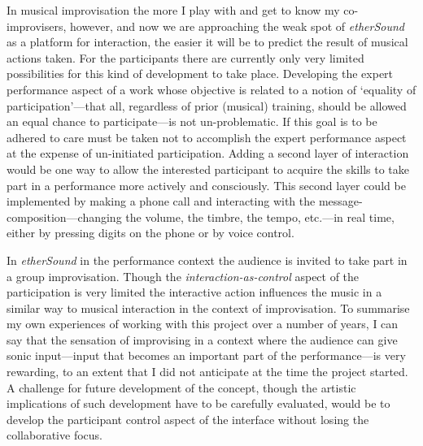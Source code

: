 In musical improvisation the more I play with and get to know my co-improvisers, however, and now we are approaching the weak spot of \emph{etherSound} as a platform for interaction, the easier it will be to predict the result of musical actions taken. For the participants there are currently only very limited possibilities for this kind of development to take place. Developing the expert performance aspect of a work whose objective is related to a notion of `equality of participation'---that all, regardless of prior (musical) training, should be allowed an equal chance to participate---is not un-problematic. If this goal is to be adhered to care must be taken not to accomplish the expert performance aspect at the expense of un-initiated participation. Adding a second layer of interaction would be one way to allow the interested participant to acquire the skills to take part in a performance more actively and consciously. This second layer could be implemented by making a phone call and interacting with the message-composition---changing the volume, the timbre, the tempo, etc.---in real time, either by pressing digits on the phone or by voice control. 

In \emph{etherSound} in the performance context the audience is invited to take part in a group improvisation. Though the \emph{interaction-as-control} aspect of the participation is very limited the interactive action influences the music in a similar way to musical interaction in the context of improvisation. 
To summarise my own experiences of working with this project over a number of years, I can say that the sensation of improvising in a context where the audience can give sonic input---input that becomes an important part of the performance---is very rewarding, to an extent that I did not anticipate at the time the project started. A challenge for future development of the concept, though the artistic implications of such development have to be carefully evaluated, would be to develop the participant control aspect of the interface without losing the collaborative focus.



